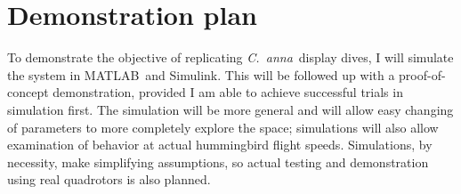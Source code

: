 \documentclass[onecolumn,10pt]{IEEEtran}
\newcommand{\Canna}{\emph{C.~anna}}
\newcommand{\MATLAB}{MATLAB}
\begin{document}
\section{Demonstration plan}
To demonstrate the objective of replicating \Canna\ display dives,  I will simulate the system in \MATLAB\ and Simulink.  This will be followed up with a proof-of-concept demonstration, provided I am able to achieve successful trials in simulation first. The simulation will be more general and will allow easy changing of parameters to more completely explore the space; simulations will also allow examination of behavior at actual hummingbird flight speeds. Simulations, by necessity, make simplifying assumptions, so actual testing and demonstration using real quadrotors is also planned.  
\end{document}
